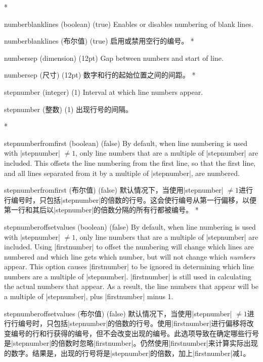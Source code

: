 \begin{optionlist}
\begin{paracol}{2}
\switchcolumn[0]*%
  \item[numberblanklines (boolean) (true)]
    Enables or disables numbering of blank lines.
    \switchcolumn
    \item[numberblanklines (布尔值) (true)]
    启用或禁用空行的编号。
\switchcolumn[0]*%
  \item[numbersep (dimension) (12pt)]
    Gap between numbers and start of line.
    \switchcolumn
    \item[numbersep (尺寸) (12pt)]
    数字和行的起始位置之间的间距。
    \switchcolumn[0]*%
  \item[stepnumber (integer) (1)]
    Interval at which line numbers appear.
    \switchcolumn
    \item[stepnumber (整数) (1)]
    出现行号的间隔。

    \switchcolumn[0]*%

\item[stepnumberfromfirst (boolean) (false)]
By default, when line numbering is used with |stepnumber| $\ne 1$, only line numbers that are a multiple of |stepnumber| are included.  This offsets the line numbering from the first line, so that the first line, and all lines separated from it by a multiple of |stepnumber|, are numbered.

\switchcolumn
\item[stepnumberfromfirst (布尔值) (false)]
 默认情况下，当使用|stepnumber| $\ne 1$进行行编号时，只包括|stepnumber|的倍数的行号。这会使行编号从第一行偏移，以便第一行和其后以|stepnumber|的倍数分隔的所有行都被编号。
\switchcolumn[0]*%
\item[stepnumberoffsetvalues (boolean) (false)]
By default, when line numbering is used with |stepnumber| $\ne 1$, only line numbers that are a multiple of |stepnumber| are included.  Using |firstnumber| to offset the numbering will change which lines are numbered and which line gets which number, but will not change which \emph{numbers} appear.  This option causes |firstnumber| to be ignored in determining which line numbers are a multiple of |stepnumber|.  |firstnumber| is still used in calculating the actual numbers that appear.  As a result, the line numbers that appear will be a multiple of |stepnumber|, plus |firstnumber| minus 1.
\switchcolumn
\item[stepnumberoffsetvalues (布尔值) (false)]
 默认情况下，当使用|stepnumber| $\ne 1$进行行编号时，只包括|stepnumber|的倍数的行号。使用|firstnumber|进行偏移将改变编号的行和行获得的编号，但不会改变出现的编号。此选项导致在确定哪些行号是|stepnumber|的倍数时忽略|firstnumber|。仍然使用|firstnumber|来计算实际出现的数字。结果是，出现的行号将是|stepnumber|的倍数，加上|firstnumber|减1。




\end{paracol}
\end{optionlist}
